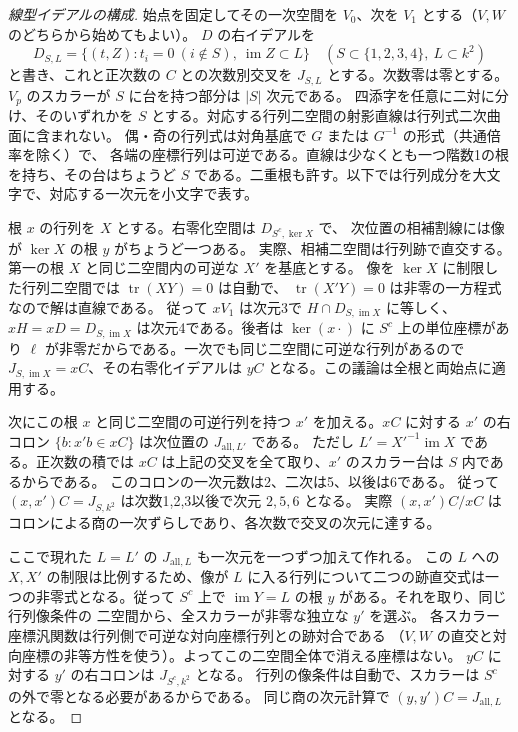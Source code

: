 \begin{proof}[線型イデアルの構成]
始点を固定してその一次空間を $V_0$、次を $V_1$ とする（$V,W$ のどちらから始めてもよい）。
$D$ の右イデアルを
\[
 D_{S,L}=\{(t,Z):t_i=0\ (i\notin S),\ \operatorname{im}Z\subset L\}
 \quad(S\subset\{1,2,3,4\},\ L\subset k^2)
\]
と書き、これと正次数の $C$ との次数別交叉を $J_{S,L}$ とする。次数零は零とする。
$V_p$ のスカラーが $S$ に台を持つ部分は $|S|$ 次元である。
四添字を任意に二対に分け、そのいずれかを $S$ とする。対応する行列二空間の射影直線は行列式二次曲面に含まれない。
偶・奇の行列式は対角基底で $G$ または $G^{-1}$ の形式（共通倍率を除く）で、
各端の座標行列は可逆である。直線は少なくとも一つ階数1の根を持ち、その台はちょうど $S$ である。二重根も許す。以下では行列成分を大文字で、対応する一次元を小文字で表す。

根 $x$ の行列を $X$ とする。右零化空間は $D_{S^c,\ker X}$ で、
次位置の相補割線には像が $\ker X$ の根 $y$ がちょうど一つある。
実際、相補二空間は行列跡で直交する。第一の根 $X$ と同じ二空間内の可逆な $X'$ を基底とする。
像を $\ker X$ に制限した行列二空間では $\operatorname{tr}(XY)=0$ は自動で、
$\operatorname{tr}(X'Y)=0$ は非零の一方程式なので解は直線である。
従って $x V_1$ は次元3で $H\cap D_{S,\operatorname{im}X}$ に等しく、
$xH=xD=D_{S,\operatorname{im}X}$ は次元4である。後者は $\ker(x\cdot)$ に
$S^c$ 上の単位座標があり $\ell$ が非零だからである。一次でも同じ二空間に可逆な行列があるので
$J_{S,\operatorname{im}X}=xC$、その右零化イデアルは $yC$ となる。この議論は全根と両始点に適用する。

次にこの根 $x$ と同じ二空間の可逆行列を持つ $x'$ を加える。$xC$ に対する $x'$ の右コロン
$\{b:x'b\in xC\}$ は次位置の $J_{\mathrm{all},L'}$ である。
ただし $L'=X'^{-1}\operatorname{im}X$ である。正次数の積では $xC$ は上記の交叉を全て取り、$x'$ のスカラー台は $S$ 内であるからである。
このコロンの一次元数は2、二次は5、以後は6である。
従って $(x,x')C=J_{S,k^2}$ は次数1,2,3以後で次元 $2,5,6$ となる。
実際 $(x,x')C/xC$ はコロンによる商の一次ずらしであり、各次数で交叉の次元に達する。

ここで現れた $L=L'$ の $J_{\mathrm{all},L}$ も一次元を一つずつ加えて作れる。
この $L$ への $X,X'$ の制限は比例するため、像が $L$ に入る行列について二つの跡直交式は一つの非零式となる。従って $S^c$ 上で $\operatorname{im}Y=L$ の根 $y$ がある。それを取り、同じ行列像条件の
二空間から、全スカラーが非零な独立な $y'$ を選ぶ。
各スカラー座標汎関数は行列側で可逆な対向座標行列との跡対合である
（$V,W$ の直交と対向座標の非等方性を使う）。よってこの二空間全体で消える座標はない。
$yC$ に対する $y'$ の右コロンは $J_{S^c,k^2}$ となる。
行列の像条件は自動で、スカラーは $S^c$ の外で零となる必要があるからである。
同じ商の次元計算で $(y,y')C=J_{\mathrm{all},L}$ となる。


\end{proof}
